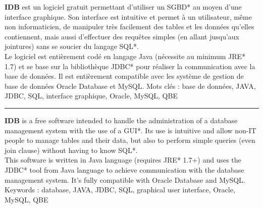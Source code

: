 \textbf{IDB} est un logiciel gratuit permettant d'utiliser un SGBD* au moyen d'une interface graphique. Son interface est intuitive et permet à un utilisateur, même non informaticien, de manipuler très facilement des tables et les données qu'elles contiennent, mais aussi d'effectuer des requêtes simples (en allant jusqu'aux jointures) sans se soucier du langage SQL*.
\\
Le logiciel est entièrement codé en langage Java (nécessite au minimum JRE* 1.7) et se base sur la bibliothèque \gls{JDBC}* pour réaliser la communication avec la base de données. Il est entièrement compatible avec les système de gestion de base de données Oracle Database et MySQL.
\bigbreak
Mots clés : base de données, JAVA, JDBC, SQL, interface graphique, Oracle, MySQL, QBE

\bigbreak
\rule{\linewidth}{0.4pt}
\bigbreak

\textbf{IDB} is a free software intended to handle the administration of a database management system with the use of a GUI*. Its use is intuitive and allow non-IT people to manage tables and their data, but also to perform simple queries (even join clause) without having to know SQL*.
\\
This software is written in Java language (requires JRE* 1.7+) and uses the \gls{JDBC}* tool from Java language to achieve communication with the database management system. It's fully compatible with Oracle Database and MySQL.
\bigbreak
Keywords : database, JAVA, JDBC, SQL, graphical user interface, Oracle, MySQL, QBE
